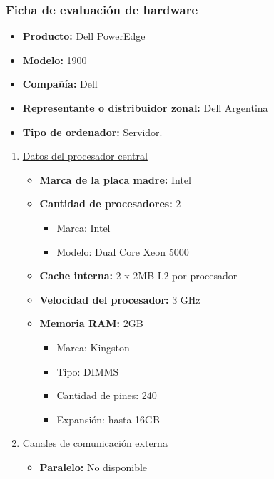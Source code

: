 \subsubsection{Ficha de evaluación de hardware}
\begin{itemize}
  \item \textbf{Producto:} Dell PowerEdge\texttrademark
  \item \textbf{Modelo:} 1900
  \item \textbf{Compañía:} Dell
  \item \textbf{Representante o distribuidor zonal:} Dell Argentina
  \item \textbf{Tipo de ordenador:} Servidor.
\end{itemize}

\begin{enumerate}

  \item \underline{Datos del procesador central}
  \begin{itemize}
    \item \textbf{Marca de la placa madre:} Intel
    
    \item \textbf{Cantidad de procesadores:} 2
    \begin{itemize}
      \item Marca: Intel
      \item Modelo: Dual Core Xeon 5000
    \end{itemize}
    
    \item \textbf{Cache interna:} 2 x 2MB L2 por procesador
    \item \textbf{Velocidad del procesador:} 3 GHz
    \item \textbf{Memoria RAM:} 2GB
    
    \begin{itemize}
      \item Marca: Kingston
      \item Tipo: DIMMS
      \item Cantidad de pines: 240
      \item Expansión: hasta 16GB
    \end{itemize}
  \end{itemize}
  
  
  \item \underline{Canales de comunicación externa}
  \begin{itemize}
    \item \textbf{Paralelo:} No disponible
    

\end{itemize}
\end{enumerate}
